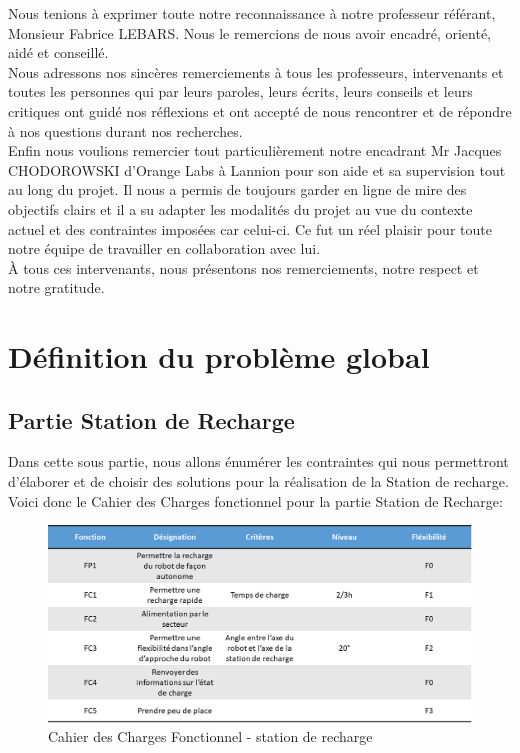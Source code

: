 \documentclass[french]{rapportENSTAB}
\begin{document}
Nous tenions à exprimer toute notre reconnaissance à notre professeur référant, Monsieur Fabrice LEBARS. Nous le remercions de nous avoir encadré, orienté, aidé et conseillé.\\

Nous adressons nos sincères remerciements à tous les professeurs, intervenants et toutes les personnes qui par leurs paroles, leurs écrits, leurs conseils et leurs critiques ont guidé nos réflexions et ont accepté de nous rencontrer et de répondre à nos questions durant nos recherches.\\

Enfin nous voulions remercier tout particulièrement notre encadrant Mr Jacques\\
CHODOROWSKI d’Orange Labs à Lannion pour son aide et sa supervision tout au long du projet. Il nous a permis de toujours garder en ligne de mire des objectifs clairs et il a su adapter les modalités du projet au vue du contexte actuel et des contraintes imposées car celui-ci. Ce fut un réel plaisir pour toute notre équipe de travailler en collaboration avec lui. \\

À tous ces intervenants, nous présentons nos remerciements, notre respect et notre gratitude.\\

\pagebreak
\section{Définition du problème global}
\subsection{Partie Station de Recharge}
Dans cette sous partie, nous allons énumérer les contraintes qui nous permettront d'élaborer et de choisir des solutions pour la réalisation de la Station de recharge. \\

Voici donc le Cahier des Charges fonctionnel pour la partie Station de Recharge:

\begin{figure}[H]
    \centering
    \includegraphics[scale=0.65]{images/station de recharge/Cahier des Charges station.png}
    \caption{Cahier des Charges Fonctionnel - station de recharge}
    \label{fig:cdcf}
\end{figure}
\end{document}
